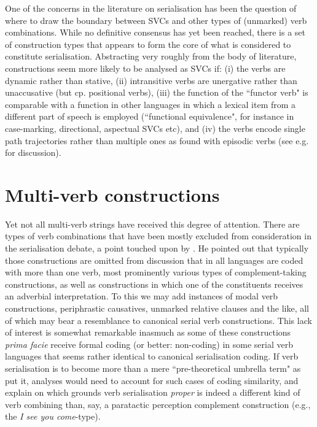 \largerpage
One of the concerns in the literature on serialisation has been the question of where to draw the boundary between SVCs and other types of (unmarked) verb combinations. While no definitive consensus has yet been reached, there is a set of construction types that appears to form the core of what is considered to constitute serialisation. Abstracting very roughly from the body of literature, constructions seem more likely to be analysed as SVCs if: (i) the verbs are dynamic rather than stative, (ii) intransitive verbs are unergative rather than unaccusative (but cp. positional verbs), (iii) the function of the ``functor verb" is comparable with a function in other languages in which a lexical item from a different part of speech is employed (``functional equivalence", for instance in case-marking, directional, aspectual SVCs etc), and (iv) the verbs encode single path trajectories rather than multiple ones as found with episodic verbs (see e.g. \citealt{pawley2011event} for discussion). 

\section{Multi-verb constructions}

Yet not all multi-verb strings have received this degree of attention. There are types of verb combinations that have been mostly excluded from consideration in the serialisation debate, a point touched upon by \citet{givon1991serial}. He pointed out that typically those constructions are omitted from discussion that in all languages are coded with more than one verb, most prominently various types of complement-taking constructions, as well as constructions in which one of the constituents receives an adverbial interpretation. To this we may add instances of modal verb constructions, periphrastic causatives, unmarked relative clauses and the like, all of which may bear a resemblance to canonical serial verb constructions. This lack of interest is somewhat remarkable inasmuch as some of these constructions \emph{prima facie} receive formal coding (or better: non-coding) in some serial verb languages that seems rather identical to canonical serialisation coding. If verb serialisation is to become more than a mere ``pre-theoretical umbrella term" as \citet{zwicky1990we} put it, analyses would need to account for such cases of coding similarity, and explain on which grounds verb serialisation \textit{proper} is indeed a different kind of verb combining than, say, a paratactic perception complement construction (e.g., the \textit{I see you come}-type). 

